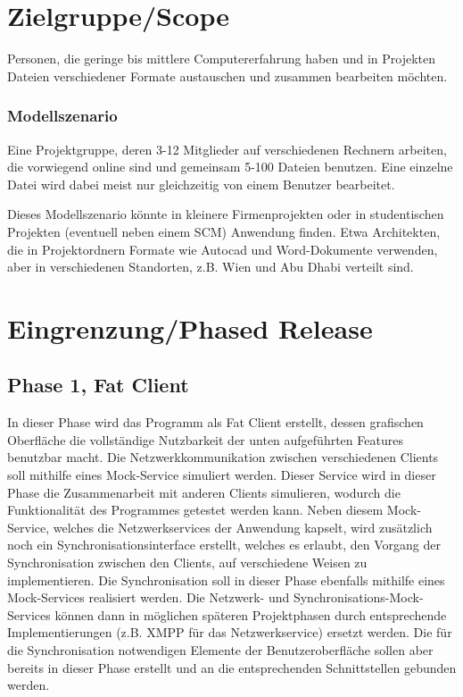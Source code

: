 \section{Zielgruppe/Scope}
Personen, die geringe bis mittlere Computererfahrung haben und in Projekten Dateien verschiedener Formate austauschen und zusammen bearbeiten möchten. 

\subsubsection{Modellszenario}
Eine Projektgruppe, deren 3-12 Mitglieder auf verschiedenen Rechnern arbeiten, die vorwiegend online sind und gemeinsam 5-100 Dateien benutzen. Eine einzelne Datei wird dabei meist nur gleichzeitig von einem Benutzer bearbeitet. 

Dieses Modellszenario könnte in kleinere Firmenprojekten oder in studentischen Projekten (eventuell neben einem SCM) Anwendung finden. Etwa Architekten, die in Projektordnern Formate wie Autocad und Word-Dokumente verwenden, aber in verschiedenen Standorten, z.B. Wien und Abu Dhabi verteilt sind. 

\section{Eingrenzung/Phased Release}

\subsection{Phase 1, Fat Client}
In dieser Phase wird das Programm als Fat Client erstellt, dessen grafischen Oberfläche die vollständige Nutzbarkeit der unten aufgeführten Features benutzbar macht. 
Die Netzwerkkommunikation zwischen verschiedenen Clients soll mithilfe eines Mock-Service simuliert werden. Dieser Service wird in dieser Phase die Zusammenarbeit mit anderen Clients simulieren, wodurch die Funktionalität des Programmes getestet werden kann. Neben diesem Mock-Service, welches die Netzwerkservices der Anwendung kapselt, wird zusätzlich noch ein Synchronisationsinterface erstellt, welches es erlaubt, den Vorgang der Synchronisation zwischen den Clients, auf verschiedene Weisen zu implementieren.
Die Synchronisation soll in dieser Phase ebenfalls mithilfe eines Mock-Services  realisiert werden. Die Netzwerk- und Synchronisations-Mock-Services können dann in möglichen späteren Projektphasen durch entsprechende Implementierungen (z.B. XMPP für das Netzwerkservice) ersetzt werden. Die für die Synchronisation notwendigen Elemente der Benutzeroberfläche sollen aber bereits in dieser Phase erstellt und an die entsprechenden Schnittstellen gebunden werden. 

